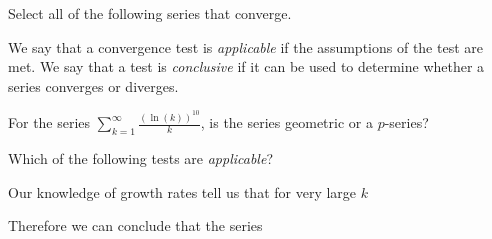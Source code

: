 \documentclass{ximera}
\author{Jim Talamo}
\begin{document}
\begin{exercise}

Select all of the following series that converge.

\begin{selectAll}
\end{selectAll}

\begin{hint}
We say that a convergence test is \emph{applicable} if the assumptions of the test are met.  We say that a test is \emph{conclusive} if it can be used to determine whether a series converges or diverges.

\begin{question}
For the series $\sum_{k=1}^{\infty} \frac{(\ln(k))^{10}}{k}$, is the series geometric or a $p$-series?

\begin{multipleChoice}
\end{multipleChoice}

 Which of the following tests are \emph{applicable}?

\begin{selectAll}
\end{selectAll}


Our knowledge of growth rates tell us that for very large $k$

\begin{multipleChoice}
\end{multipleChoice}

Therefore we can conclude that the series 

\begin{multipleChoice}
\end{multipleChoice}


\end{question}
\end{hint}
\end{exercise}
\end{document}
